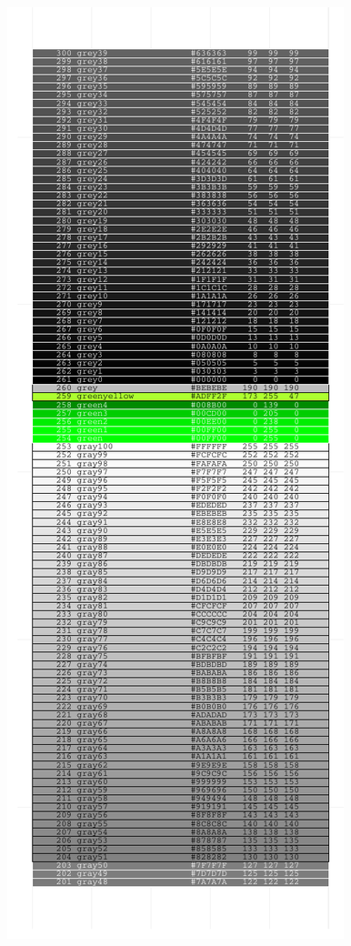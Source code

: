 \documentclass[letterpaper]{article}
\begin{document}
\begin{center}
\begin{figure}[ht]
\begin{minipage}[b]{0.5\linewidth}
\includegraphics{ggplotCheatSheet-007}
\end{minipage}

\end{figure}
\end{center}
\end{document}
